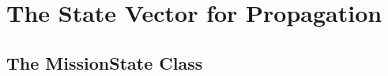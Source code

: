 \chapter{\label{chapter:PropagatorStates}The State Vector for Propagation}


%
%

\section{The MissionState Class}

